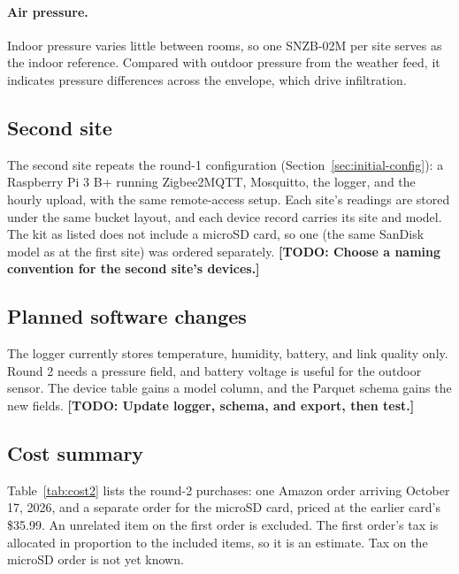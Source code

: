 \documentclass[11pt,letterpaper]{article}
\newcommand{\todo}[1]{\textbf{[TODO: #1]}}
\begin{document}
\paragraph{Air pressure.} Indoor pressure varies little between rooms, so one
SNZB-02M per site serves as the indoor reference. Compared with outdoor
pressure from the weather feed, it indicates pressure differences across the
envelope, which drive infiltration.

\subsection{Second site}

The second site repeats the round-1 configuration (Section~\ref{sec:initial-config}):
a Raspberry Pi 3 B+ running Zigbee2MQTT, Mosquitto, the logger, and the hourly
upload, with the same remote-access setup. Each site's readings are stored
under the same bucket layout, and each device record carries its site and model.
The kit as listed does not include a microSD card, so one (the same SanDisk
model as at the first site) was ordered separately. \todo{Choose a naming convention for the second site's devices.}

\subsection{Planned software changes}

The logger currently stores temperature, humidity, battery, and link quality
only. Round 2 needs a pressure field, and battery voltage is useful for the
outdoor sensor. The device table gains a model column, and the Parquet schema
gains the new fields. \todo{Update logger, schema, and export, then test.}

\subsection{Cost summary}

Table~\ref{tab:cost2} lists the round-2 purchases: one Amazon order arriving
October 17, 2026, and a separate order for the microSD card, priced at the
earlier card's \$35.99. An unrelated item on the first order is excluded. The
first order's tax is allocated in proportion to the included items, so it is an
estimate. Tax on the microSD order is not yet known.
\end{document}
